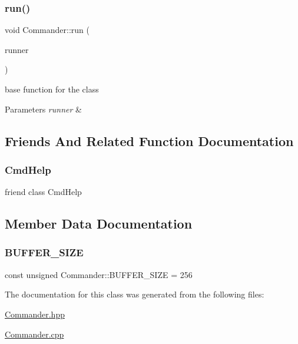 \subsubsection{\texorpdfstring{run()}{run()}}
{\footnotesize\ttfamily void Commander\+::run (\begin{DoxyParamCaption}\item[{\hyperlink{Command_8hpp_ad45c3de597c2023a8be0399d914161f4}{Runner\+Type} \&}]{runner }\end{DoxyParamCaption})\hspace{0.3cm}{\ttfamily [static]}}

base function for the class 
\begin{DoxyParams}{Parameters}
{\em runner} & \\
\hline
\end{DoxyParams}


\subsection{Friends And Related Function Documentation}
\mbox{\label{classCommander_aaf5700242631ebac67a8b2f6eaf9c730}} 
\subsubsection{\texorpdfstring{Cmd\+Help}{CmdHelp}}
{\footnotesize\ttfamily friend class Cmd\+Help\hspace{0.3cm}{\ttfamily [friend]}}



\subsection{Member Data Documentation}
\mbox{\label{classCommander_a9e1b32d844b2d8080e51c4e8a4ca0442}} 
\subsubsection{\texorpdfstring{B\+U\+F\+F\+E\+R\+\_\+\+S\+I\+ZE}{BUFFER\_SIZE}}
{\footnotesize\ttfamily const unsigned Commander\+::\+B\+U\+F\+F\+E\+R\+\_\+\+S\+I\+ZE = 256\hspace{0.3cm}{\ttfamily [static]}}



The documentation for this class was generated from the following files\+:\begin{DoxyCompactItemize}
\item 
\hyperlink{Commander_8hpp}{Commander.\+hpp}\item 
\hyperlink{Commander_8cpp}{Commander.\+cpp}\end{DoxyCompactItemize}
